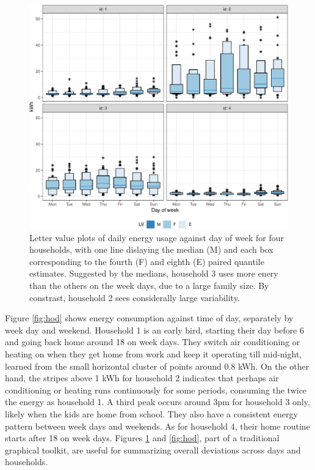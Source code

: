 \documentclass[12pt]{article}
\begin{document}
\begin{figure}

{\centering \includegraphics[width=\textwidth]{figure/dow-1} 

}

\caption{Letter value plots of daily energy usage against day of week for four households, with one line dislaying the median (M) and each box corresponding to the fourth (F) and eighth (E) paired quantile estimates. Suggested by the medians, household 3 uses more enery than the others on the week days, due to a large family size. By constrast, household 2 sees considerally large variability.}\label{fig:dow}
\end{figure}

Figure \ref{fig:hod} shows energy consumption against time of day,
separately by week day and weekend. Household 1 is an early bird,
starting their day before 6 and going back home around 18 on week days.
They switch air conditioning or heating on when they get home from work
and keep it operating till mid-night, learned from the small horizontal
cluster of points around 0.8 kWh. On the other hand, the stripes above 1
kWh for household 2 indicates that perhaps air conditioning or heating
runs continuously for some periods, consuming the twice the energy as
household 1. A third peak occurs around 3pm for household 3 only, likely
when the kids are home from school. They also have a consistent energy
pattern between week days and weekends. As for household 4, their home
routine starts after 18 on week days. Figures \ref{fig:dow} and
\ref{fig:hod}, part of a traditional graphical toolkit, are useful for
summarizing overall deviations across days and households.
\end{document}
